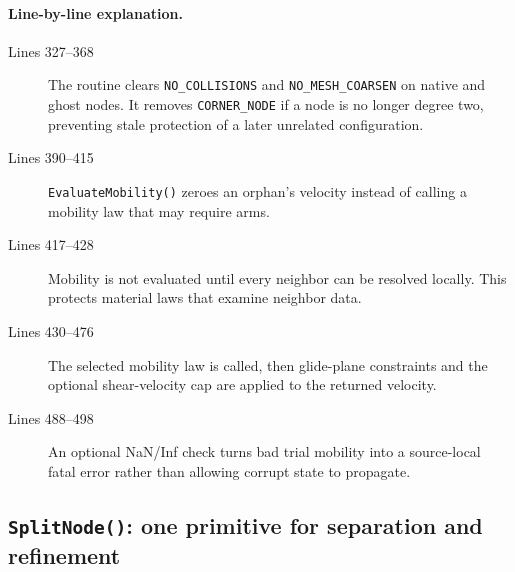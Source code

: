 \documentclass[11pt]{article}
\newcommand{\code}[1]{\texorpdfstring{\nolinkurl{#1}}{#1}}
\begin{document}


\paragraph{Line-by-line explanation.}
\begin{description}
\item[Lines 327--368] The routine clears \code{NO_COLLISIONS} and
\code{NO_MESH_COARSEN} on native and ghost nodes. It removes
\code{CORNER_NODE} if a node is no longer degree two, preventing stale
protection of a later unrelated configuration.
\item[Lines 390--415] \code{EvaluateMobility()} zeroes an orphan's velocity
instead of calling a mobility law that may require arms.
\item[Lines 417--428] Mobility is not evaluated until every neighbor can be
resolved locally. This protects material laws that examine neighbor data.
\item[Lines 430--476] The selected mobility law is called, then glide-plane
constraints and the optional shear-velocity cap are applied to the returned
velocity.
\item[Lines 488--498] An optional NaN/Inf check turns bad trial mobility into
a source-local fatal error rather than allowing corrupt state to propagate.
\end{description}

\subsection{\code{SplitNode()}: one primitive for separation and refinement}


\end{document}
